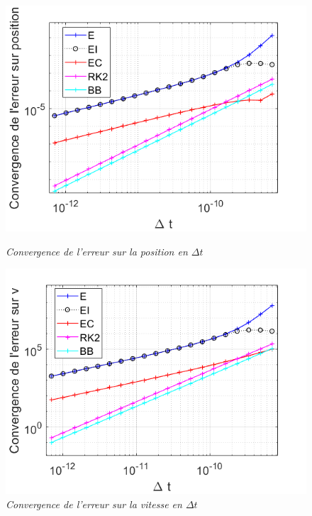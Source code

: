\documentclass[a4paper,12pt,twoside]{article}
\begin{document}
		\begin{figure}[h]
			\begin{minipage}[c]{.46\linewidth}
				\centering
				\includegraphics[scale=0.6]{Convergence_erreur_position_tous_integrateurs.png}
				\caption{\em\label{Fig:Convergence erreur position} Convergence de l'erreur sur la position en $\Delta t$}
			\end{minipage}
			\hfill%
			\begin{minipage}[c]{.46\linewidth}
				\centering
				\includegraphics[scale = 0.6]{Convergence_erreur_vitesse_tous_integrateurs.png}
				\caption{\em\label{Fig: Convergence erreur vitesse} Convergence de l'erreur sur la vitesse en $\Delta t$}
			\end{minipage}
		\end{figure}
\end{document}
